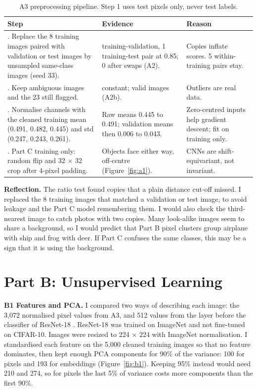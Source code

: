 \documentclass[9pt,a4paper]{extarticle}
\begin{document}
\begin{table}[H]
\centering\footnotesize\renewcommand{\arraystretch}{1.0}
\caption{A3 preprocessing pipeline. Step 1 uses test pixels only, never test labels.}
\label{tab:a2}
\begin{tabularx}{\textwidth}{@{}>{\raggedright\arraybackslash}p{}>{\raggedright\arraybackslash}p{}>{\raggedright\arraybackslash}X@{}}
\toprule
Step & Evidence & Reason \\
\midrule
1. Replace the 8 training images paired with validation or test images by unsampled same-class images (seed 33). & 7 training-validation, 1 training-test pair at 0.85; 0 after swaps (A2). & Copies inflate scores. 5 within-training pairs stay. \\
2. Keep ambiguous images and the 23 still flagged. & 0 constant; valid images (A2b). & Outliers are real data. \\
3. Normalise channels with the cleaned training mean (0.491, 0.482, 0.445) and std (0.247, 0.243, 0.261). & Raw means 0.445 to 0.491; validation means then 0.006 to 0.043. & Zero-centred inputs help gradient descent; fit on training only. \\
4. Part C training only: random flip and 32 × 32 crop after 4-pixel padding. & Objects face either way, off-centre (Figure~\ref{fig:a1}). & CNNs are shift-equivariant, not invariant. \\
\bottomrule
\end{tabularx}
\end{table}

\textbf{Reflection.} The ratio test found copies that a plain distance cut-off missed. I replaced the 8 training images that matched a validation or test image, to avoid leakage and the Part C model remembering them. I would also check the third-nearest image to catch photos with two copies. Many look-alike images seem to share a background, so I would predict that Part B pixel clusters group airplane with ship and frog with deer. If Part C confuses the same classes, this may be a sign that it is using the background.

\newpage
\section*{Part B: Unsupervised Learning}
\setcounter{figure}{0}\setcounter{table}{0}
\renewcommand{\thefigure}{B\arabic{figure}}
\renewcommand{\thetable}{B\arabic{table}}
\textbf{B1 Features and PCA.} I compared two ways of describing each image: the 3,072 normalised pixel values from A3, and 512 values from the layer before the classifier of ResNet-18 \citep{he2016resnet}. ResNet-18 was trained on ImageNet \citep{deng2009imagenet} and not fine-tuned on CIFAR-10. Images were resized to 224 × 224 with ImageNet normalisation. I standardised each feature on the 5,000 cleaned training images so that no feature dominates, then kept enough PCA components for 90\% of the variance: 100 for pixels and 193 for embeddings (Figure~\ref{fig:b1}). Keeping 95\% instead would need 210 and 274, so for pixels the last 5\% of variance costs more components than the first 90\%.
\end{document}
